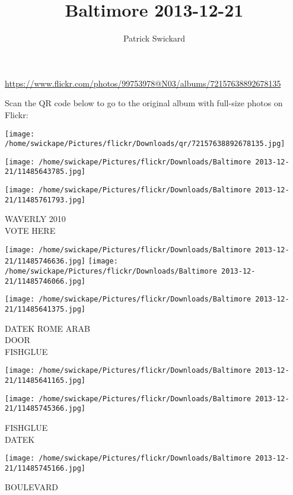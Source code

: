 \documentclass[10pt,letterpaper]{article}
\title{Baltimore 2013-12-21}
\author{Patrick Swickard}
\date{}
\begin{document}
\maketitle

\url{https://www.flickr.com/photos/99753978@N03/albums/72157638892678135}

Scan the QR code below to go to the original album with full-size photos on Flickr:

\texttt{[image: /home/swickape/Pictures/flickr/Downloads/qr/72157638892678135.jpg]}
\pagebreak

\texttt{[image: /home/swickape/Pictures/flickr/Downloads/Baltimore 2013-12-21/11485643785.jpg]}

\vspace{0.25in}
\texttt{[image: /home/swickape/Pictures/flickr/Downloads/Baltimore 2013-12-21/11485761793.jpg]}

WAVERLY 2010\\
VOTE HERE
\pagebreak

\texttt{[image: /home/swickape/Pictures/flickr/Downloads/Baltimore 2013-12-21/11485746636.jpg]}
\texttt{[image: /home/swickape/Pictures/flickr/Downloads/Baltimore 2013-12-21/11485746066.jpg]}

\texttt{[image: /home/swickape/Pictures/flickr/Downloads/Baltimore 2013-12-21/11485641375.jpg]}

DATEK ROME ARAB\\
DOOR\\
FISHGLUE
\pagebreak

\texttt{[image: /home/swickape/Pictures/flickr/Downloads/Baltimore 2013-12-21/11485641165.jpg]}

\vspace{0.25in}
\texttt{[image: /home/swickape/Pictures/flickr/Downloads/Baltimore 2013-12-21/11485745366.jpg]}

FISHGLUE\\
DATEK
\pagebreak

\texttt{[image: /home/swickape/Pictures/flickr/Downloads/Baltimore 2013-12-21/11485745166.jpg]}

BOULEVARD
\pagebreak
\end{document}
